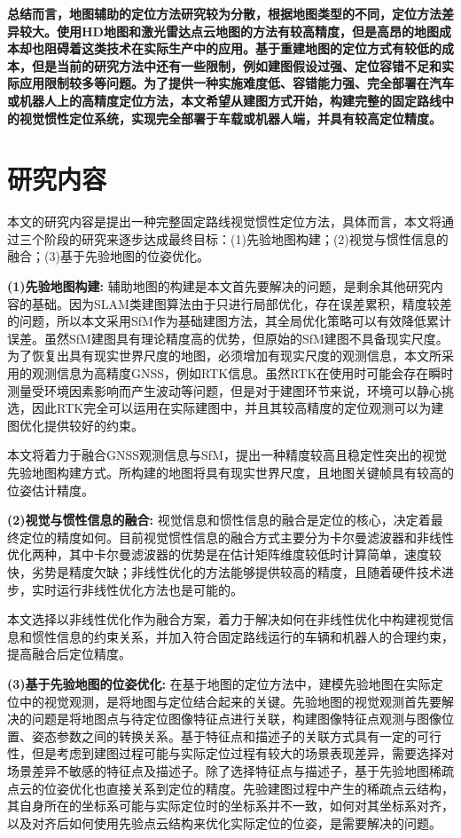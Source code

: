 \textbf{总结而言，地图辅助的定位方法研究较为分散，根据地图类型的不同，定位方法差异较大。使用HD地图和激光雷达点云地图的方法有较高精度，但是高昂的地图成本却也阻碍着这类技术在实际生产中的应用。基于重建地图的定位方式有较低的成本，但是当前的研究方法中还有一些限制，例如建图假设过强、定位容错不足和实际应用限制较多等问题。为了提供一种实施难度低、容错能力强、完全部署在汽车或机器人上的高精度定位方法，本文希望从建图方式开始，构建完整的固定路线中的视觉惯性定位系统，实现完全部署于车载或机器人端，并具有较高定位精度。}


\section{研究内容}

本文的研究内容是提出一种完整固定路线视觉惯性定位方法，具体而言，本文将通过三个阶段的研究来逐步达成最终目标：(1)先验地图构建；(2)视觉与惯性信息的融合；(3)基于先验地图的位姿优化。


\textbf{(1)先验地图构建:}
辅助地图的构建是本文首先要解决的问题，是剩余其他研究内容的基础。因为SLAM类建图算法由于只进行局部优化，存在误差累积，精度较差的问题，所以本文采用SfM作为基础建图方法，其全局优化策略可以有效降低累计误差。虽然SfM建图具有理论精度高的优势，但原始的SfM建图不具备现实尺度。为了恢复出具有现实世界尺度的地图，必须增加有现实尺度的观测信息，本文所采用的观测信息为高精度GNSS，例如RTK信息。虽然RTK在使用时可能会存在瞬时测量受环境因素影响而产生波动等问题，但是对于建图环节来说，环境可以静心挑选，因此RTK完全可以运用在实际建图中，并且其较高精度的定位观测可以为建图优化提供较好的约束。

本文将着力于融合GNSS观测信息与SfM，提出一种精度较高且稳定性突出的视觉先验地图构建方式。所构建的地图将具有现实世界尺度，且地图关键帧具有较高的位姿估计精度。

\textbf{(2)视觉与惯性信息的融合:}
视觉信息和惯性信息的融合是定位的核心，决定着最终定位的精度如何。目前视觉惯性信息的融合方式主要分为卡尔曼滤波器和非线性优化两种，其中卡尔曼滤波器的优势是在估计矩阵维度较低时计算简单，速度较快，劣势是精度欠缺；非线性优化的方法能够提供较高的精度，且随着硬件技术进步，实时运行非线性优化方法也是可能的。

本文选择以非线性优化作为融合方案，着力于解决如何在非线性优化中构建视觉信息和惯性信息的约束关系，并加入符合固定路线运行的车辆和机器人的合理约束，提高融合后定位精度。

\textbf{(3)基于先验地图的位姿优化:}
在基于地图的定位方法中，建模先验地图在实际定位中的视觉观测，是将地图与定位结合起来的关键。先验地图的视觉观测首先要解决的问题是将地图点与待定位图像特征点进行关联，构建图像特征点观测与图像位置、姿态参数之间的转换关系。基于特征点和描述子的关联方式具有一定的可行性，但是考虑到建图过程可能与实际定位过程有较大的场景表现差异，需要选择对场景差异不敏感的特征点及描述子。除了选择特征点与描述子，基于先验地图稀疏点云的位姿优化也直接关系到定位的精度。先验建图过程中产生的稀疏点云结构，其自身所在的坐标系可能与实际定位时的坐标系并不一致，如何对其坐标系对齐，以及对齐后如何使用先验点云结构来优化实际定位的位姿，是需要解决的问题。

